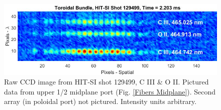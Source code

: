 \begin{center}
\begin{figure}
\centering
\includegraphics[width=6in]{HITSI_CCD_3}\caption{Raw CCD image from HIT-SI shot 129499, C III \& O II. Pictured data from upper 1/2 midplane port (Fig. \ref{Fibers Midplane}). Second array (in poloidal port) not pictured. Intensity units arbitrary. }\label{HITSI_CCD}
\end{figure}
\end{center}


